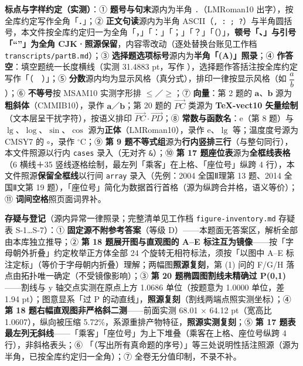 \begin{gktip}
\textbf{标点与字样约定（实测）}：① \textbf{题号与句末}源内为半角 \texttt{.}（LMRoman10 出字），按全库约定写作全角「．」；② \textbf{正文句读}源内为半角 ASCII（\texttt{, : ; ?}）与半角圆括号，本文件按全库约定归一为全角「，」「：」「；」「？」「（）」，\textbf{顿号「、」与引号「“”」为全角 CJK·照源保留}，内容零改动（逐处替换台账见工作档 \texttt{transcripts/partB.md}）；③ \textbf{选择题选项标号}源内为\textbf{半角「(A)」照录}；④ \textbf{作答空}：填空题统一长度横线（实测 31.4883 pt，写作 \texttt{\gkblank{}}），选择题作答括注按全库约定写作「（　）」；⑤ \textbf{分数}源内均为显示风格（真分式），排印一律按显示风格（如 \(\dfrac{a}{b}\)）；⑥ \textbf{不等号}按 MSAM10 实测字形排 \(\leqslant\)／\(\geqslant\)；⑦ \textbf{向量}：第 2 题的 \(\boldsymbol{a}\)、\(\boldsymbol{b}\) 源为\textbf{粗斜体}（CMMIB10），录作 \(\boldsymbol{a}\)／\(\boldsymbol{b}\)；第 20 题的 \(\overrightarrow{PC}\) 类源为 \textbf{TeX-vect10 矢量绘制}（文本层呈干扰字符），按语义排印 \(\overrightarrow{PC}\cdot\overrightarrow{PD}\)；⑧ \textbf{常数与函数名}：\(\mathrm{e}\)（第 8 题）与 \(\lg\)、\(\log\)、\(\sin\)、\(\cos\) 源为\textbf{正体}（LMRoman10），录作 \(\mathrm{e}\)、\(\lg\) 等；温度度号源为 CMSY7 的 \(\circ\)，录作 \(^{\circ}\mathrm{C}\)；⑨ \textbf{第 9 题不等式组}源为\textbf{行内竖排三行}（与整句同行），本文件照源以行内 \texttt{cases} 录入（无对齐 \texttt{\&}）；⑩ \textbf{第 17 题座位表}源为\textbf{全框线表格}（6 横线＋35 竖线逐格绘制，最左列「乘客」在上格、「座位号」纵跨 4 行），本文件照源\textbf{保留全框线}以行间 \texttt{array} 录入（先例：2004 全国Ⅱ理第 13 题、2014 全国Ⅱ文第 19 题），「座位号」简化为数据首行首格（源为纵跨合并格，语义等价）；⑪ \textbf{词间空格}照页面词界补。

\textbf{存疑与登记}（源内异常一律照录；完整清单见工作档 \texttt{figure-inventory.md} 存疑表 S-1…S-7）：① \textbf{固定源不附参考答案}（等级 D）——本题面无答案区，解析全部由本库独立推导；② \textbf{第 18 题展开图与直观图的 A–E 标注互为镜像}——按「字母朝外折叠」约定枚举正方体全部 24 个旋转无相符标法，须按「以图中 A–E 标注定标」（等价于字母朝内折叠）理解；两幅图\textbf{照源复刻}，第 (1) 问的 F/G/H 落点由拓扑唯一确定（不受镜像影响）；③ \textbf{第 20 题椭圆图割线未精确过 P(0,1)}——割线与 y 轴交点实测在原点上方 1.0686 单位（按题意为 1.0000 单位，差 1.94 pt）；图意显系「过 P 的动直线」，\textbf{照源复刻}（割线两端点照实测坐标）；④ \textbf{第 18 题右幅直观图非严格斜二测}——前面实测 68.01 \(\times\) 64.12 pt（宽高比 1.0607），纵向被压缩 5.72\%，系源重排产物特征，\textbf{照源实测复刻}；⑤ \textbf{第 17 题表最左列无斜线}——「乘客」「座位号」为上下堆叠（乘客在上格、座位号纵跨 4 行），非斜格表头；⑥ 「（写出所有真命题的序号）」等三处说明性括注照源（源为半角，已按全库约定归一全角）；⑦ 全卷无分值印制，不录不补。
\end{gktip}

